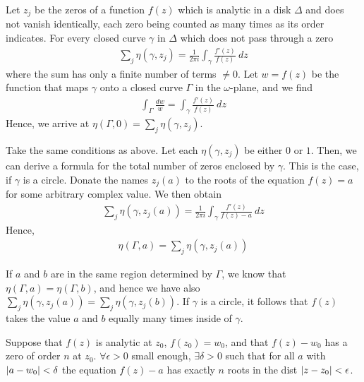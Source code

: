 \begin{theorem}
    Let $z_j$ be the zeros of a function $f(z)$ which is analytic in a disk $\Delta$
    and does not vanish identically, each zero being counted as many times as its
    order indicates. For every closed curve $\gamma$ in $\Delta$ which does not pass
    through a zero
    \begin{align*}
        \sum_j \eta(\gamma,z_j) = \frac{1}{2 \pi i} \int_\gamma \frac{f'(z)}{f(z)} \ dz
    \end{align*}
    where the sum has only a finite number of terms $\neq 0$. Let $w = f(z)$ be
    the function that maps $\gamma$ onto a closed curve $\Gamma$ in the $\omega$-plane,
    and we find
    \begin{align*}
        \int_\Gamma \frac{d w}{w} = \int_\gamma \frac{f'(z)}{f(z)} \ dz
    \end{align*}
    Hence, we arrive at $\eta(\Gamma,0) = \sum_j \eta(\gamma,z_j)$.
\end{theorem}

\begin{theorem}
    Take the same conditions as above. Let each $\eta(\gamma,z_j)$ be either $0$ or $1$.
    Then, we can derive a formula for the total number of zeros enclosed by $\gamma$.
    This is the case, if $\gamma$ is a circle. Donate the names $z_j(a)$ to the roots
    of the equation $f(z) = a$ for some arbitrary complex value. We then obtain
    \begin{align*}
        \sum_j \eta(\gamma,z_j(a)) = \frac{1}{2 \pi i} \int_\gamma \frac{f'(z)}{f(z) - a} \ dz
    \end{align*}
    Hence,
    \begin{align*}
        \eta(\Gamma,a) = \sum_j \eta(\gamma , z_j(a))
    \end{align*}
\end{theorem}

\begin{theorem}
    If $a$ and $b$ are in the same region determined by $\Gamma$, we know that
    $\eta(\Gamma,a) = \eta(\Gamma,b)$, and hence we have also $\sum_j \eta(\gamma,z_j(a))
    = \sum_j \eta(\gamma,z_j(b))$. If $\gamma$ is a circle, it follows that $f(z)$ takes
    the value $a$ and $b$ equally many times inside of $\gamma$.
\end{theorem}

\begin{theorem}
    Suppose that $f(z)$ is analytic at $z_0$, $f(z_0) = w_0$, and that $f(z) -w_0$
    has a zero of order $n$ at $z_0$. $\forall \epsilon > 0$ small enough, $\exists
    \delta > 0$ such that for all $a$ with $\left\vert a-w_0 \right\vert < \delta$ the equation
    $f(z) - a$ has exactly $n$ roots in the dist $\left\vert z-z_0 \right\vert < \epsilon$. 
\end{theorem}

